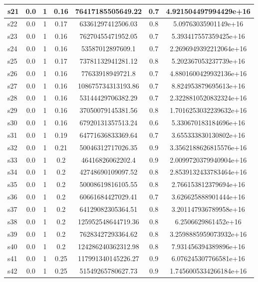 \documentclass{article}
\begin{document}
\begin{tabular}{|l|c|c|c|c|c|c|}
\hline
s21 &0.0 & 1 & 0.16 & 76417185505649.22 & 0.7 & 4.921504497994429e+16\\
\hline
s22 &0.0 & 1 & 0.17 & 63361297412506.03 & 0.8 & 5.09763035901149e+16\\
\hline
s23 &0.0 & 1 & 0.16 & 76270455471952.05 & 0.7 & 5.393417557359425e+16\\
\hline
s24 &0.0 & 1 & 0.16 & 53587012897609.1 & 0.7 & 2.2696949392212064e+16\\
\hline
s25 &0.0 & 1 & 0.17 & 73781132941281.12 & 0.8 & 5.202367053237739e+16\\
\hline
s26 &0.0 & 1 & 0.16 & 77633918949721.8 & 0.7 & 4.8801600429932136e+16\\
\hline
s27 &0.0 & 1 & 0.16 & 108675734313193.86 & 0.7 & 8.824953879695613e+16\\
\hline
s28 &0.0 & 1 & 0.16 & 53144429706382.29 & 0.7 & 2.3228810520832324e+16\\
\hline
s29 &0.0 & 1 & 0.16 & 37050079145381.56 & 0.8 & 1.7016253032239632e+16\\
\hline
s30 &0.0 & 1 & 0.16 & 67920131357513.24 & 0.6 & 5.330670183184696e+16\\
\hline
s31 &0.0 & 1 & 0.19 & 64771636833369.64 & 0.7 & 3.655333830130802e+16\\
\hline
s32 &0.0 & 1 & 0.21 & 50046312717026.35 & 0.9 & 3.3562188626815576e+16\\
\hline
s33 &0.0 & 1 & 0.2 & 46416826062202.4 & 0.9 & 2.0099720379940904e+16\\
\hline
s34 &0.0 & 1 & 0.2 & 42748690109097.52 & 0.8 & 2.8539132433783464e+16\\
\hline
s35 &0.0 & 1 & 0.2 & 50008619816105.55 & 0.8 & 2.766153812379694e+16\\
\hline
s36 &0.0 & 1 & 0.2 & 60661684427029.41 & 0.7 & 3.626625888901444e+16\\
\hline
s37 &0.0 & 1 & 0.2 & 64129082305364.51 & 0.8 & 3.201147936789958e+16\\
\hline
s38 &0.0 & 1 & 0.2 & 125952548644719.36 & 0.8 & 6.2506629861452e+16\\
\hline
s39 &0.0 & 1 & 0.2 & 76283427293364.62 & 0.8 & 3.2598885959073932e+16\\
\hline
s40 &0.0 & 1 & 0.2 & 124286240362312.98 & 0.8 & 7.931456394389896e+16\\
\hline
s41 &0.0 & 1 & 0.25 & 117991340145226.27 & 0.9 & 6.076245307766581e+16\\
\hline
s42 &0.0 & 1 & 0.25 & 51549265780627.73 & 0.9 & 1.7456005334266184e+16\\

\end{tabular}
\end{document}
